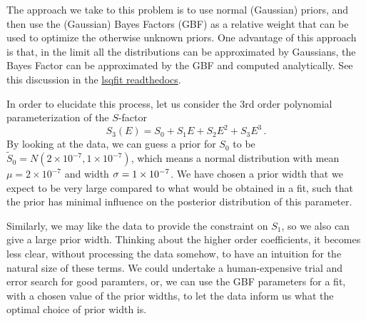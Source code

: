 \documentclass[prd,10pt,superscriptaddress,notitlepage,tightenlines,nofootinbib,floatfix]{revtex4-1}
\begin{document}
The approach we take to this problem is to use normal (Gaussian) priors, and then use the (Gaussian) Bayes Factors (GBF) as a relative weight that can be used to optimize the otherwise unknown priors.
One advantage of this approach is that, in the limit all the distributions can be approximated by Gaussians, the Bayes Factor can be approximated by the GBF and computed analytically.  See this discussion in the 
\href{https://lsqfit.readthedocs.io/en/latest/overview.html?highlight=Bayes%20Factor#correlated-parameters-gaussian-bayes-factor}{lsqfit readthedocs}.

In order to elucidate this process, let us consider the 3rd order polynomial parameterization of the $S$-factor
\begin{equation}
    S_3(E) = S_0 + S_1 E + S_2 E^2 + S_3 E^3\, .
\end{equation}
By looking at the data, we can guess a prior for $S_0$ to be $\tilde{S}_0 = N(2\times10^{-7}, 1\times10^{-7})$, which means a normal distribution with mean $\mu=2\times10^{-7}$ and width ${\sigma}=1\times10^{-7}$.  We have chosen a prior width that we expect to be very large compared to what would be obtained in a fit, such that the prior has minimal influence on the posterior distribution of this parameter.

Similarly, we may like the data to provide the constraint on $S_1$, so we also can give a large prior width.  Thinking about the higher order coefficients, it becomes less clear, without processing the data somehow, to have an intuition for the natural size of these terms.  We could undertake a human-expensive trial and error search for good paramters, or, we can use the GBF parameters for a fit, with a chosen value of the prior widths, to let the data inform us what the optimal choice of prior width is.
\end{document}
